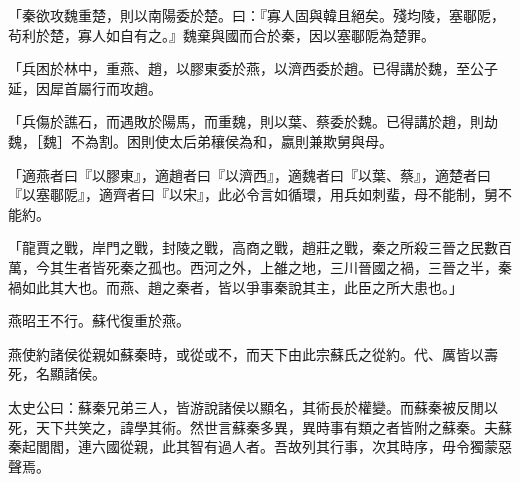 \begin{pinyinscope}
「秦欲攻魏重楚，則以南陽委於楚。曰：『寡人固與韓且絕矣。殘均陵，塞鄳阸，茍利於楚，寡人如自有之。』魏棄與國而合於秦，因以塞鄳阸為楚罪。

「兵困於林中，重燕、趙，以膠東委於燕，以濟西委於趙。已得講於魏，至公子延，因犀首屬行而攻趙。

「兵傷於譙石，而遇敗於陽馬，而重魏，則以葉、蔡委於魏。已得講於趙，則劫魏，［魏］不為割。困則使太后弟穰侯為和，嬴則兼欺舅與母。

「適燕者曰『以膠東』，適趙者曰『以濟西』，適魏者曰『以葉、蔡』，適楚者曰『以塞鄳阸』，適齊者曰『以宋』，此必令言如循環，用兵如刺蜚，母不能制，舅不能約。

「龍賈之戰，岸門之戰，封陵之戰，高商之戰，趙莊之戰，秦之所殺三晉之民數百萬，今其生者皆死秦之孤也。西河之外，上雒之地，三川晉國之禍，三晉之半，秦禍如此其大也。而燕、趙之秦者，皆以爭事秦說其主，此臣之所大患也。」

燕昭王不行。蘇代復重於燕。

燕使約諸侯從親如蘇秦時，或從或不，而天下由此宗蘇氏之從約。代、厲皆以壽死，名顯諸侯。

太史公曰：蘇秦兄弟三人，皆游說諸侯以顯名，其術長於權變。而蘇秦被反閒以死，天下共笑之，諱學其術。然世言蘇秦多異，異時事有類之者皆附之蘇秦。夫蘇秦起閭閻，連六國從親，此其智有過人者。吾故列其行事，次其時序，毋令獨蒙惡聲焉。


\end{pinyinscope}